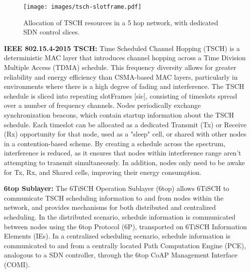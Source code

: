 \begin{figure}[ht]
\centering
  \texttt{[image: images/tsch-slotframe.pdf]}
  \caption{Allocation of TSCH resources in a 5 hop network, with dedicated SDN control slices.}
  \label{fig:track_schedule}
\end{figure}

\textbf{IEEE 802.15.4-2015 TSCH:} 
Time Scheduled Channel Hopping (TSCH) is a deterministic MAC layer that introduces channel hopping across a Time Division Multiple Access (TDMA) schedule. This frequency diversity allows for greater reliability and energy efficiency than CSMA-based MAC layers, particularly in environments where there is a high degree of fading and interference. The TSCH schedule is sliced into repeating slotFrames [sic], consisting of timeslots spread over a number of frequency channels. Nodes periodically exchange synchronization beacons, which contain startup information about the TSCH schedule. Each timeslot can be allocated as a dedicated Transmit (Tx) or Receive (Rx) opportunity for that node, used as a "sleep" cell, or shared with other nodes in a contention-based scheme. By creating a schedule across the spectrum, interference is reduced, as it ensures that nodes within interference range aren't attempting to transmit simultaneously. In addition, nodes only need to be awake for Tx, Rx, and Shared cells, improving their energy consumption. 

\textbf{6top Sublayer:} 
The 6TiSCH Operation Sublayer (6top) allows 6TiSCH to communicate TSCH scheduling information to and from nodes within the network, and provides mechanisms for both distributed and centralized scheduling. In the distributed scenario, schedule information is communicated between nodes using the 6top Protocol (6P), transported on 6TiSCH Information Elements (IEs). In a centralized scheduling scenario, schedule information is communicated to and from a centrally located Path Computation Engine (PCE), analogous to a SDN controller, through the 6top CoAP Management Interface (COMI).

